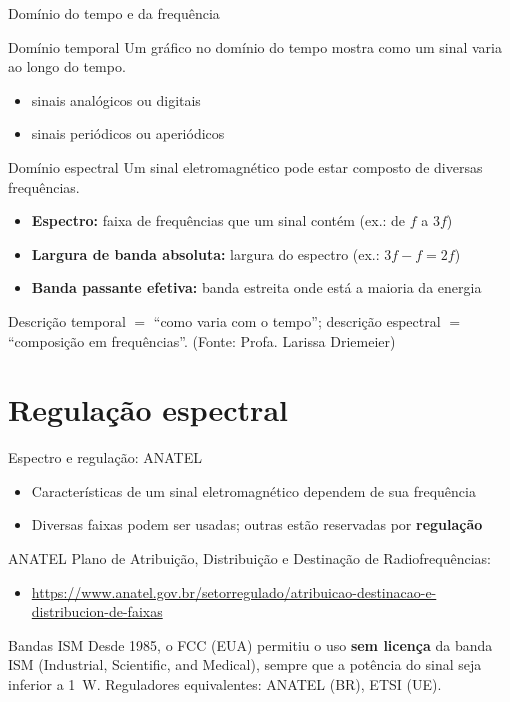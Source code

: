\documentclass[aspectratio=169,11pt]{beamer}
\begin{document}
\begin{frame}{Domínio do tempo e da frequência}
  \begin{block}{Domínio temporal}
    Um gráfico no domínio do tempo mostra como um sinal varia ao longo do tempo.
    \begin{itemize}
      \item sinais analógicos ou digitais
      \item sinais periódicos ou aperiódicos
    \end{itemize}
  \end{block}
  \begin{block}{Domínio espectral}
    Um sinal eletromagnético pode estar composto de diversas frequências.
    \begin{itemize}
      \item \textbf{Espectro:} faixa de frequências que um sinal contém (ex.: de $f$ a $3f$)
      \item \textbf{Largura de banda absoluta:} largura do espectro (ex.: $3f - f = 2f$)
      \item \textbf{Banda passante efetiva:} banda estreita onde está a maioria da energia
    \end{itemize}
  \end{block}
  \begin{center}
    \scriptsize Descrição temporal $=$ ``como varia com o tempo''; descrição espectral $=$ ``composição em frequências''. (Fonte: Profa. Larissa Driemeier)
  \end{center}
\end{frame}

\section{Regulação espectral}

\begin{frame}{Espectro e regulação: ANATEL}
  \begin{itemize}
    \item Características de um sinal eletromagnético dependem de sua frequência
    \item Diversas faixas podem ser usadas; outras estão reservadas por \textbf{regulação}
  \end{itemize}
  \begin{block}{ANATEL}
    Plano de Atribuição, Distribuição e Destinação de Radiofrequências:
    \begin{itemize}
      \item \url{https://www.anatel.gov.br/setorregulado/atribuicao-destinacao-e-distribucion-de-faixas}
    \end{itemize}
  \end{block}
  \begin{block}{Bandas ISM}
    Desde 1985, o FCC (EUA) permitiu o uso \textbf{sem licença} da banda ISM (Industrial, Scientific, and Medical), sempre que a potência do sinal seja inferior a 1~W. Reguladores equivalentes: ANATEL (BR), ETSI (UE).
  \end{block}
\end{frame}
\end{document}
